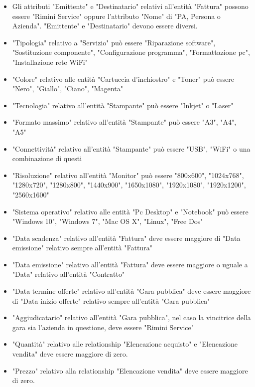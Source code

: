 
\begin{itemize}
\item Gli attributi "Emittente" e "Destinatario" relativi all'entità "Fattura" possono essere "Rimini Service" oppure l'attributo "Nome" di "PA, Persona o Azienda". "Emittente" e "Destinatario" devono essere diversi.
\item "Tipologia" relativo a "Servizio" può essere "Riparazione software", "Sostituzione componente", "Configurazione programma", "Formattazione pc", "Installazione rete WiFi"
\item "Colore" relativo alle entità "Cartuccia d'inchiostro" e "Toner" può essere "Nero", "Giallo", "Ciano", "Magenta"
\item "Tecnologia" relativo all'entità "Stampante" può essere "Inkjet" o "Laser"
\item "Formato massimo" relativo all'entità "Stampante" può essere "A3", "A4", "A5"
\item "Connettività" relativo all'entità "Stampante" può essere "USB", "WiFi" o una combinazione di questi
\item "Risoluzione" relativo all'entità "Monitor" può essere "800x600", "1024x768", "1280x720", "1280x800", "1440x900", "1650x1080", "1920x1080", "1920x1200", "2560x1600"
\item "Sistema operativo" relativo alle entità "Pc Desktop" e "Notebook" può essere "Windows 10", "Windows 7", "Mac OS X", "Linux", "Free Dos"
\item "Data scadenza" relativo all'entità "Fattura" deve essere maggiore di "Data emissione" relativo sempre all'entità "Fattura"
\item "Data emissione" relativo all'entità "Fattura" deve essere maggiore o uguale a "Data" relativo all'entità "Contratto"
\item "Data termine offerte" relativo all'entità "Gara pubblica" deve essere maggiore di "Data inizio offerte" relativo sempre all'entità "Gara pubblica"
\item "Aggiudicatario" relativo all'entità "Gara pubblica", nel caso la vincitrice della gara sia l'azienda in questione, deve essere "Rimini Service"
\item "Quantità" relativo alle relationship "Elencazione acquisto" e "Elencazione vendita" deve essere maggiore di zero.
\item "Prezzo" relativo alla relationship "Elencazione vendita" deve essere maggiore di zero.

\end{itemize}
